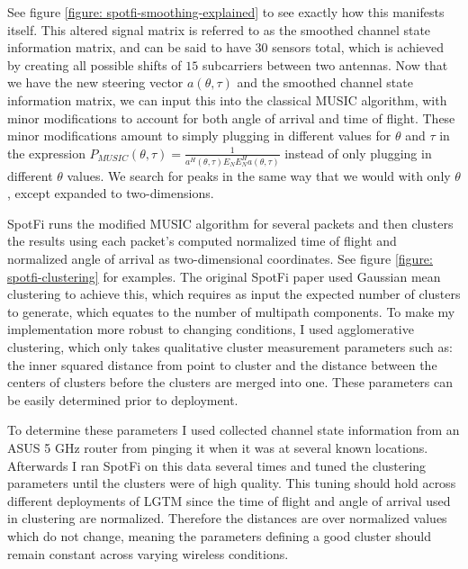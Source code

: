 \documentclass[12pt]{report}
\begin{document}
See figure \ref{figure: spotfi-smoothing-explained} to see exactly how this manifests itself. This altered signal matrix is referred to as the smoothed channel state information matrix, and can be said to have $30$ sensors total, which is achieved by creating all possible shifts of $15$ subcarriers between two antennas. Now that we have the new steering vector $a(\theta, \tau)$ and the smoothed channel state information matrix, we can input this into the classical MUSIC algorithm, with minor modifications to account for both angle of arrival and time of flight. These minor modifications amount to simply plugging in different values for $\theta$ and $\tau$ in the expression $P_{MUSIC}(\theta, \tau) = \frac{1}{a^{H}(\theta, \tau) E_{N} E^{H}_{N} a(\theta, \tau)}$ instead of only plugging in different $\theta$ values. We search for peaks in the same way that we would with only $\theta$, except expanded to two-dimensions. \par

SpotFi runs the modified MUSIC algorithm for several packets and then clusters the results using each packet's computed normalized time of flight and normalized angle of arrival as two-dimensional coordinates. See figure \ref{figure: spotfi-clustering} for examples. The original SpotFi paper used Gaussian mean clustering to achieve this, which requires as input the expected number of clusters to generate, which equates to the number of multipath components. To make my implementation more robust to changing conditions, I used agglomerative clustering, which only takes qualitative cluster measurement parameters such as: the inner squared distance from point to cluster and the distance between the centers of clusters before the clusters are merged into one. These parameters can be easily determined prior to deployment. \par

To determine these parameters I used collected channel state information from an ASUS 5 GHz router from pinging it when it was at several known locations. Afterwards I ran SpotFi on this data several times and tuned the clustering parameters until the clusters were of high quality. This tuning should hold across different deployments of LGTM since the time of flight and angle of arrival used in clustering are normalized. Therefore the distances are over normalized values which do not change, meaning the parameters defining a good cluster should remain constant across varying wireless conditions. \par
\end{document}

